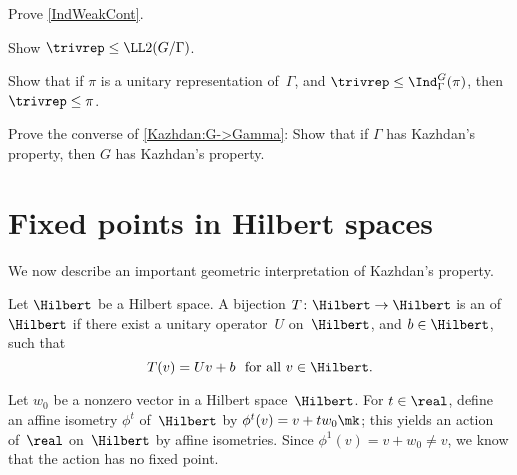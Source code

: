 \begin{exercises}

\item \label{IndWeakContEx}
Prove \cref{IndWeakCont}.

\item \label{1<L2(G/Gamma)}
Show $\trivrep \le \LL2(G/\Gamma)$.

\item \label{1<Ind->1<rho}
Show that if $\pi$ is a unitary representation of~$\Gamma$, and $\trivrep \le \Ind_\Gamma^G(\pi)$, then $\trivrep \le \pi$.

\item \label{GammaT->GT}
Prove the converse of \cref{Kazhdan:G->Gamma}: Show that if $\Gamma$ has Kazhdan's property, then $G$ has Kazhdan's property.

\end{exercises}
 
 
 
 
 \section{Fixed points in Hilbert spaces}

We now describe an important geometric interpretation of Kazhdan's
property. 

 \begin{defn} \label{AffIsomDefn}
 Let $\Hilbert$ be a Hilbert space. A bijection $T
\colon \Hilbert \to \Hilbert$ is an 
of~$\Hilbert$ if there exist a unitary operator~$U$ on~$\Hilbert$, and $b \in \Hilbert$,
such that 
	$$ \text{$T(v) = Uv + b$ \  for all $v \in \Hilbert$} .$$
 \end{defn}

\begin{eg} \label{NoFPEg}
Let $w_0$ be a nonzero vector in a Hilbert space~$\Hilbert$. For $t \in \real$, define an affine isometry $\phi^t$ of~$\Hilbert$ by $\phi^t (v) = v + t w_0\mk$; this yields an action of~$\real$ on~$\Hilbert$ by affine isometries. Since $\phi^1(v) = v + w_0 \neq v$, we know that the action has no fixed point. 
\end{eg}

